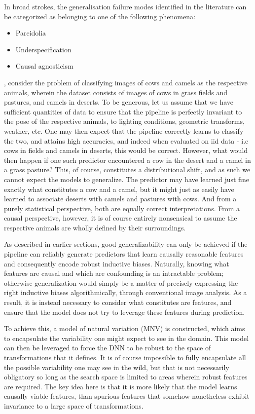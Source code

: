 	In broad strokes, the generalisation failure modes identified in the literature can be categorized as belonging to one of the following phenomena:
		\begin{itemize}
			\item Pareidolia
			\item Underspecification
			\item Causal agnosticism 
		\end{itemize}
		
		, consider the problem of classifying images of cows and camels as the respective animals, wherein the dataset consists of images of cows in grass fields and pastures, and camels in deserts. To be generous, let us assume that we have sufficient quantities of data to ensure that the pipeline is perfectly invariant to the pose of the respective animals, to lighting conditions, geometric transforms, weather, etc. One may then expect that the pipeline correctly learns to classify the two, and attains high accuracies, and indeed when evaluated on iid data - i.e cows in fields and camels in deserts, this would be correct. However, what would then happen if one such predictor encountered a cow in the desert and a camel in a grass pasture? This, of course, constitutes a distributional shift, and as such we cannot expect the models to generalize. The predictor may have learned just fine exactly what constitutes a cow and a camel, but it might just as easily have learned to associate deserts with camels and pastures with cows. And from a purely statistical perspective, both are equally correct interpretations. From a causal perspective, however, it is of course entirely nonsensical to assume the respective animals are wholly defined by their surroundings.


		As described in earlier sections, good generalizability can only be achieved if the pipeline can reliably generate predictors that learn causally reasonable features and consequently encode robust inductive biases. Naturally, knowing what features are causal and which are confounding is an intractable problem; otherwise generalization would simply be a matter of precisely expressing the right inductive biases algorithmically, through conventional image analysis. As a result, it is instead necessary to consider what constitutes are  features, and ensure that the model does not try to leverage these features during prediction. 

		To achieve this, a model of natural variation (MNV) is constructed, which aims to encapsulate the variability one might expect to see in the domain. This model can then be leveraged to force the DNN to be robust to the space of transformations that it defines. It is of course impossible to fully encapsulate all the possible variability one may see in the wild, but that is not necessarily obligatory so long as the search space is limited to areas wherein robust features are required. The key idea here is that it is more likely that the model learns causally viable features, than spurious features that somehow nonetheless exhibit invariance to a large space of transformations. 
		
